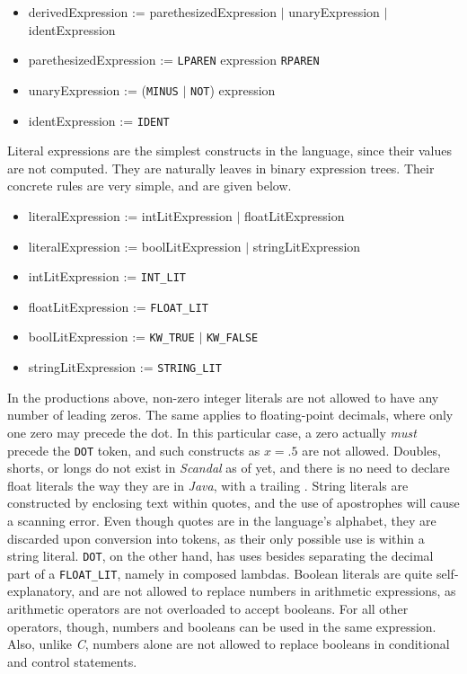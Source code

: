 \begin{itemize}
	\item derivedExpression := parethesizedExpression $|$ unaryExpression $|$ identExpression
	\item parethesizedExpression := \texttt{LPAREN} expression \texttt{RPAREN}
	\item unaryExpression := (\texttt{MINUS} $|$ \texttt{NOT}) expression
	\item identExpression := \texttt{IDENT}
\end{itemize}

Literal expressions are the simplest constructs in the language, since their values are not computed. They are naturally leaves in binary expression trees. Their concrete rules are very simple, and are given below.

\begin{itemize}
	\item literalExpression := intLitExpression $|$ floatLitExpression
	\item literalExpression := boolLitExpression $|$ stringLitExpression
	\item intLitExpression := \texttt{INT\_LIT}
	\item floatLitExpression := \texttt{FLOAT\_LIT}
	\item boolLitExpression := \texttt{KW\_TRUE} $|$ \texttt{KW\_FALSE}
	\item stringLitExpression := \texttt{STRING\_LIT}
\end{itemize}

In the productions above, non-zero integer literals are not allowed to have any number of leading zeros. The same applies to floating-point decimals, where only one zero may precede the dot. In this particular case, a zero actually \emph{must} precede the \texttt{DOT} token, and such constructs as $x = .5$ are not allowed. Doubles, shorts, or longs do not exist in \emph{Scandal} as of yet, and there is no need to declare float literals the way they are in \emph{Java}, with a trailing . String literals are constructed by enclosing text within quotes, and the use of apostrophes will cause a scanning error. Even though quotes are in the language's alphabet, they are discarded upon conversion into tokens, as their only possible use is within a string literal. \texttt{DOT}, on the other hand, has uses besides separating the decimal part of a \texttt{FLOAT\_LIT}, namely in composed lambdas. Boolean literals are quite self-explanatory, and are not allowed to replace numbers in arithmetic expressions, as arithmetic operators are not overloaded to accept booleans. For all other operators, though, numbers and booleans can be used in the same expression. Also, unlike \emph{C}, numbers alone are not allowed to replace booleans in conditional and control statements.

